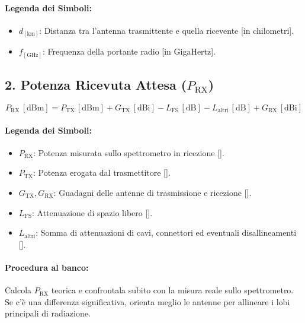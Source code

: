 \documentclass[openany,a4paper,12pt]{book}
\begin{document}
\paragraph{Legenda dei Simboli:}
\begin{itemize}
    \item $d_{[\text{km}]}$: Distanza tra l'antenna trasmittente e quella ricevente [in chilometri].
    \item $f_{[\text{GHz}]}$: Frequenza della portante radio [in GigaHertz].
\end{itemize}

\subsection{2. Potenza Ricevuta Attesa ($P_{\text{RX}}$)}

\begin{tcolorbox}[title=Equazione Completa del Link Budget]
\[
P_{\text{RX}} \, [\text{dBm}] = P_{\text{TX}} \, [\text{dBm}] + G_{\text{TX}} \, [\text{dBi}] - L_{\text{FS}} \, [\text{dB}] - L_{\text{altri}} \, [\text{dB}] + G_{\text{RX}} \, [\text{dBi}]
\]
\end{tcolorbox}

\paragraph{Legenda dei Simboli:}
\begin{itemize}
    \item $P_{\text{RX}}$: Potenza misurata sullo spettrometro in ricezione [].
    \item $P_{\text{TX}}$: Potenza erogata dal trasmettitore [].
    \item $G_{\text{TX}}, G_{\text{RX}}$: Guadagni delle antenne di trasmissione e ricezione [].
    \item $L_{\text{FS}}$: Attenuazione di spazio libero [].
    \item $L_{\text{altri}}$: Somma di attenuazioni di cavi, connettori ed eventuali disallineamenti [].
\end{itemize}

\paragraph{Procedura al banco:}
Calcola $P_{\text{RX}}$ teorica e confrontala subito con la misura reale sullo spettrometro. Se c'è una differenza significativa, orienta meglio le antenne per allineare i lobi principali di radiazione.
\end{document}
